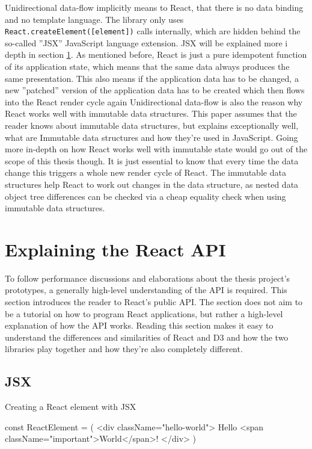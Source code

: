 Unidirectional data-flow implicitly means to React, that there is no data binding and no template language. The library only uses \texttt{React.createElement([element])} calls internally, which are hidden behind the so-called ''JSX'' JavaScript language extension. JSX will be explained more i depth in section \ref{sec:reactApi}. As mentioned before, React is just a pure idempotent function of its application state, which means that the same data always produces the same presentation. This also means if the application data has to be changed, a new ''patched'' version of the application data has to be created which then flows into the React render cycle again Unidirectional data-flow is also the reason why React works well with immutable data structures. This paper assumes that the reader knows about immutable data structures, but \cite{ImmutableJS} explains exceptionally well, what are Immutable data structures and how they're used in JavaScript. Going more in-depth on how React works well with immutable state would go out of the scope of this thesis though. It is just essential to know that every time the data change this triggers a whole new render cycle of React. The immutable data structures help React to work out changes in the data structure, as nested data object tree differences can be checked via a cheap equality check when using immutable data structures.

\section{Explaining the React API}
\label{sec:reactApi}

To follow performance discussions and elaborations about the thesis project's prototypes, a generally high-level understanding of the API is required. This section introduces the reader to React's public API. The section does not aim to be a tutorial on how to program React applications, but rather a high-level explanation of how the API works. Reading this section makes it easy to understand the differences and similarities of React and D3 and how the two libraries play together and how they're also completely different.

\subsection{JSX}

\begin{program}
\caption{Creating a React element with JSX} 
\label{prog:reactJsxElement}
\begin{JsCode}
const ReactElement = (
  <div className="hello-world">
    Hello <span className="important">World</span>!
  </div>
)
\end{JsCode}
\end{program}

